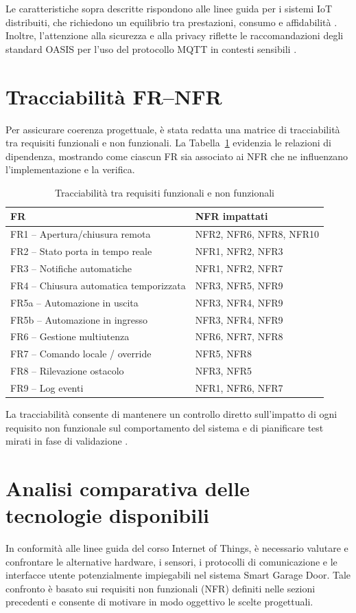 Le caratteristiche sopra descritte rispondono alle linee guida per i sistemi IoT distribuiti, che richiedono un equilibrio tra prestazioni, consumo e affidabilità \cite{Piyare2013, Palattella2016}.  
Inoltre, l’attenzione alla sicurezza e alla privacy riflette le raccomandazioni degli standard OASIS per l’uso del protocollo MQTT in contesti sensibili \cite{MQTTspec}.

\section{Tracciabilità FR–NFR}
Per assicurare coerenza progettuale, è stata redatta una matrice di tracciabilità tra requisiti funzionali e non funzionali.  
La Tabella~\ref{tab:trace} evidenzia le relazioni di dipendenza, mostrando come ciascun FR sia associato ai NFR che ne influenzano l’implementazione e la verifica.

\begin{table}[h!]
\centering
\caption{Tracciabilità tra requisiti funzionali e non funzionali}
\label{tab:trace}
\begin{tabularx}{\textwidth}{@{}lX@{}}
\toprule
\textbf{FR} & \textbf{NFR impattati} \\
\midrule
FR1 – Apertura/chiusura remota & NFR2, NFR6, NFR8, NFR10 \\
FR2 – Stato porta in tempo reale & NFR1, NFR2, NFR3 \\
FR3 – Notifiche automatiche & NFR1, NFR2, NFR7 \\
FR4 – Chiusura automatica temporizzata & NFR3, NFR5, NFR9 \\
FR5a – Automazione in uscita & NFR3, NFR4, NFR9 \\
FR5b – Automazione in ingresso & NFR3, NFR4, NFR9 \\
FR6 – Gestione multiutenza & NFR6, NFR7, NFR8 \\
FR7 – Comando locale / override & NFR5, NFR8 \\
FR8 – Rilevazione ostacolo & NFR3, NFR5 \\
FR9 – Log eventi & NFR1, NFR6, NFR7 \\
\bottomrule
\end{tabularx}
\end{table}

La tracciabilità consente di mantenere un controllo diretto sull’impatto di ogni requisito non funzionale sul comportamento del sistema e di pianificare test mirati in fase di validazione \cite{Pressman2019}.


\section{Analisi comparativa delle tecnologie disponibili} In conformità alle linee guida del corso Internet of Things, è necessario valutare e confrontare le alternative hardware, i sensori, i protocolli di comunicazione e le interfacce utente potenzialmente impiegabili nel sistema Smart Garage Door. Tale confronto è basato sui requisiti non funzionali (NFR) definiti nelle sezioni precedenti e consente di motivare in modo oggettivo le scelte progettuali.

